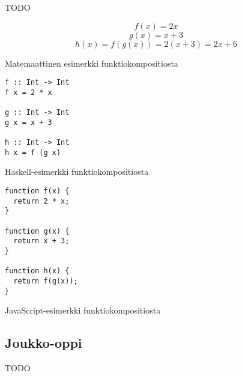TODO

\begin{code}
	\begin{equation}
		f(x) = 2x
	\end{equation}
	\begin{equation}
		g(x) = x + 3
	\end{equation}
	\begin{equation}
		h(x) = f(g(x)) = 2(x + 3) = 2x + 6
	\end{equation}
	\caption{Matemaattinen esimerkki funktiokompositiosta}
	\label{equation:composition}
\end{code}
\bigskip

\begin{code}
	\begin{verbatim}
f :: Int -> Int
f x = 2 * x

g :: Int -> Int
g x = x + 3

h :: Int -> Int
h x = f (g x)
\end{verbatim}
	\caption{Haskell-esimerkki funktiokompositiosta}
	\label{code:haskell_composition}
\end{code}
\bigskip
\begin{code}
	\begin{verbatim}
function f(x) {
  return 2 * x;
}

function g(x) {
  return x + 3;
}

function h(x) {
  return f(g(x));
}
\end{verbatim}
	\caption{JavaScript-esimerkki funktiokompositiosta}
	\label{code:javascript_composition}
\end{code}


\subsection{Joukko-oppi}

TODO

